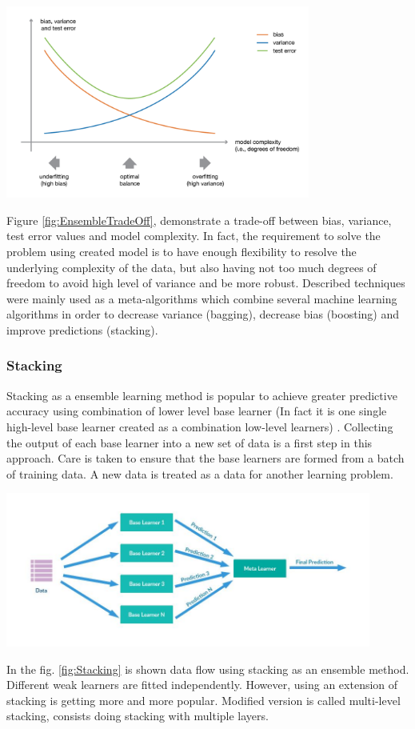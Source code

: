 \begin{center}
	\includegraphics[width=10cm, keepaspectratio]{diagrams/tradeoff}
	\center
	\label{fig:EnsembleTradeOff}
\end{center}
Figure \ref{fig:EnsembleTradeOff}, demonstrate a trade-off between bias, variance, test error values and model complexity. In fact, the requirement to solve the problem using created model is to have enough flexibility to resolve the underlying complexity of the data, but also having not too much degrees of freedom to avoid high level of variance and be more robust.
Described techniques were mainly used as a meta-algorithms which combine several machine learning algorithms in order to decrease variance (bagging), decrease bias (boosting) and improve predictions (stacking).

\subsubsection{Stacking}
Stacking as a ensemble learning method is popular to achieve greater predictive accuracy using combination of lower level base learner (In fact it is one single high-level base learner created as a combination low-level learners) \cite{StackingDefinition}. Collecting the output of each base learner into a new set of data is a first step in this approach. Care is taken to ensure that the base learners are formed from a batch of training data. A new data is treated as a data for another learning problem.
\begin{center}
	\includegraphics[width=12cm, keepaspectratio]{diagrams/stacking.jpg}
	\center
	\label{fig:Stacking}
\end{center}
In the fig. \ref{fig:Stacking} is shown data flow using stacking as an ensemble method. Different weak learners are fitted independently. However, using an extension of stacking is getting more and more popular. Modified version is called multi-level stacking, consists doing stacking with multiple layers.
